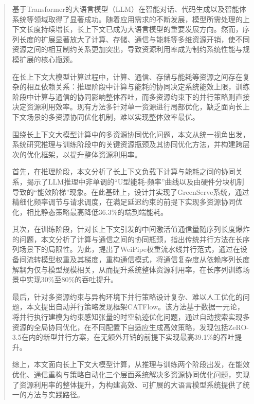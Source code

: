 \begin{abstract}
基于Transformer的大语言模型（LLM）在智能对话、代码生成以及智能体系统等领域取得了显著成功。随着应用需求的不断发展，模型所需处理的上下文长度持续增长，长上下文已成为大语言模型的重要发展方向。然而，序列长度的扩展显著放大了计算、存储、通信与能耗等多维资源开销，使不同资源之间的相互制约关系更加突出，导致资源利用率成为制约系统性能与规模扩展的核心瓶颈。

在长上下文大模型计算过程中，计算、通信、存储与能耗等资源之间存在复杂的相互依赖关系：推理阶段中计算与能耗的协同决定系统能效上限，训练阶段中计算与通信的协同影响整体吞吐，而多资源约束下的并行策略则直接决定资源利用效率。现有方法多针对单一资源进行局部优化，缺乏面向长上下文场景的多资源协同优化机制，难以实现整体效率最优。

围绕长上下文大模型计算中的多资源协同优化问题，本文从统一视角出发，系统研究推理与训练阶段中的关键资源瓶颈及其协同优化方法，并构建跨层次的优化框架，以提升整体资源利用率。

首先，在推理阶段，本文分析了长上下文负载下计算与能耗之间的协同关系，揭示了LLM推理中非单调的“U型能耗-频率”曲线以及由硬件分块机制导致的“能效阶梯”现象。在此基础上，设计并实现了GreenServe系统，通过精细化频率调节与请求调度，在满足延迟约束的前提下实现多资源协同优化，相比静态策略最高降低36.3\%的端到端能耗。

其次，在训练阶段，针对长上下文引发的中间激活值通信量随序列长度爆炸的问题，本文分析了计算与通信之间的协同瓶颈，指出传统并行方法在长序列场景下的局限性。为此，提出了WeiPipe权重流水线并行范式，通过在设备间流转模型权重及其梯度，重构通信模式，将通信复杂度从依赖序列长度解耦为仅与模型规模相关，从而提升系统整体资源利用率，在长序列训练场景中实现30\%至80\%的吞吐提升。

最后，针对多资源约束与异构环境下并行策略设计复杂、难以人工优化的问题，本文提出自动并行策略发现框架CATFlow。该方法基于数据一元论，将并行执行建模为约束感知张量的时空轨迹优化问题，通过自动搜索实现多资源的全局协同优化，在不同配置下自适应生成高效策略，发现包括ZeRO-3.5在内的新型并行方案，在无额外开销的前提下实现最高39.1\%的吞吐提升。

综上，本文面向长上下文大模型计算，从推理与训练两个阶段出发，在能效优化、通信重构与策略自动化三个层面系统解决多资源协同优化问题，实现了资源利用率的整体提升，为构建高效、可扩展的大语言模型系统提供了统一的方法与实践路径。

\end{abstract}